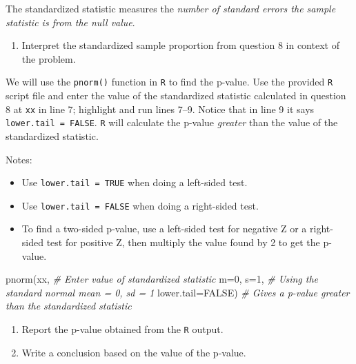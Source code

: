 \documentclass[
]{report}
\newenvironment{Shaded}{\begin{snugshade}}{\end{snugshade}}
\newcommand{\AttributeTok}[1]{\textcolor[rgb]{0.77,0.63,0.00}{#1}}
\newcommand{\CommentTok}[1]{\textcolor[rgb]{0.56,0.35,0.01}{\textit{#1}}}
\newcommand{\ConstantTok}[1]{\textcolor[rgb]{0.00,0.00,0.00}{#1}}
\newcommand{\DecValTok}[1]{\textcolor[rgb]{0.00,0.00,0.81}{#1}}
\newcommand{\FunctionTok}[1]{\textcolor[rgb]{0.00,0.00,0.00}{#1}}
\newcommand{\NormalTok}[1]{#1}
\providecommand{\tightlist}{%
  \setlength{\itemsep}{0pt}\setlength{\parskip}{0pt}}
\begin{document}
\newpage

The standardized statistic measures the \emph{number of standard errors the sample statistic is from the null value}.

\begin{enumerate}
\def\labelenumi{\arabic{enumi}.}
\setcounter{enumi}{9}
\tightlist
\item
  Interpret the standardized sample proportion from question 8 in context of the problem.
\end{enumerate}

\vspace{.8in}

We will use the \texttt{pnorm()} function in \texttt{R} to find the p-value. Use the provided \texttt{R} script file and enter the value of the standardized statistic calculated in question 8 at \texttt{xx} in line 7; highlight and run lines 7--9. Notice that in line 9 it says \texttt{lower.tail\ =\ FALSE}. \texttt{R} will calculate the p-value \emph{greater} than the value of the standardized statistic.

Notes:

\begin{itemize}
\tightlist
\item
  Use \texttt{lower.tail\ =\ TRUE} when doing a left-sided test.
\item
  Use \texttt{lower.tail\ =\ FALSE} when doing a right-sided test.
\item
  To find a two-sided p-value, use a left-sided test for negative Z or a right-sided test for positive Z, then multiply the value found by 2 to get the p-value.
\end{itemize}

\begin{Shaded}
\begin{Highlighting}[]
\FunctionTok{pnorm}\NormalTok{(xx, }\CommentTok{\# Enter value of standardized statistic}
      \AttributeTok{m=}\DecValTok{0}\NormalTok{, }\AttributeTok{s=}\DecValTok{1}\NormalTok{, }\CommentTok{\# Using the standard normal mean = 0, sd = 1}
      \AttributeTok{lower.tail=}\ConstantTok{FALSE}\NormalTok{) }\CommentTok{\# Gives a p{-}value greater than the standardized statistic}
\end{Highlighting}
\end{Shaded}

\begin{enumerate}
\def\labelenumi{\arabic{enumi}.}
\setcounter{enumi}{10}
\item
  Report the p-value obtained from the \texttt{R} output.
  \vspace{0.2in}
\item
  Write a conclusion based on the value of the p-value.
  \vspace{0.8in}
\end{enumerate}
\end{document}
